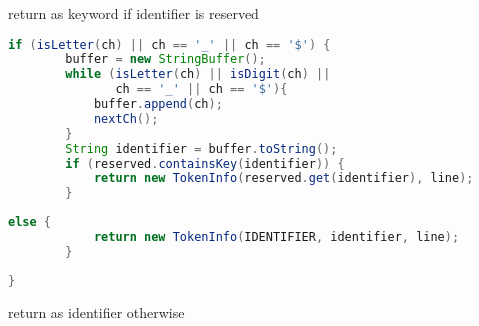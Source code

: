 \documentclass[8pt,a4paper,compress]{beamer}
\begin{document}
\begin{frame}[fragile]
\begin{overprint}
\begin{tcolorbox}[enhanced,drop shadow southwest,sharp corners,size=fbox,colback=white,fontlower=\small\ttfamily,collower=silver900]
\tcblower
\begin{minipage}[t][.25cm][t]{\textwidth}
return as keyword if identifier is reserved
\end{minipage}
\end{tcolorbox}

\begin{tcolorbox}[enhanced,drop shadow southwest,sharp corners,size=fbox,colback=white,fontlower=\small\ttfamily,collower=silver900]

\begin{lstlisting}[language=Java,style=focusout]
    if (isLetter(ch) || ch == '_' || ch == '$') {
        buffer = new StringBuffer();
        while (isLetter(ch) || isDigit(ch) || 
               ch == '_' || ch == '$'){
            buffer.append(ch);
            nextCh();
        }
        String identifier = buffer.toString();                 
        if (reserved.containsKey(identifier)) {
            return new TokenInfo(reserved.get(identifier), line); 
        }
\end{lstlisting}
\begin{lstlisting}[language=Java,style=focusin,backgroundcolor=\color{lime100}]
        else {                     
            return new TokenInfo(IDENTIFIER, identifier, line);                 
        }
\end{lstlisting}
\begin{lstlisting}[language=Java,style=focusout]
    }
\end{lstlisting}

\tcblower
\begin{minipage}[t][.25cm][t]{\textwidth}
return as identifier otherwise
\end{minipage}
\end{tcolorbox}
\end{overprint}
\end{frame}
\end{document}
